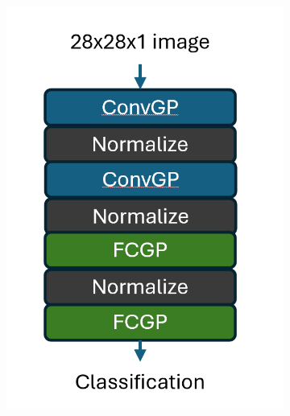 \documentclass{article}
\begin{document}
\begin{figure}[h]
    \centering
    \centering
    \begin{subfigure}[b]{0.3\columnwidth}
        \includegraphics[width=\textwidth]{MNIST_model.png}
        \caption{}
    \end{subfigure}
    \begin{subfigure}[b]{0.3\columnwidth}

\end{subfigure}
\end{figure}
\end{document}
